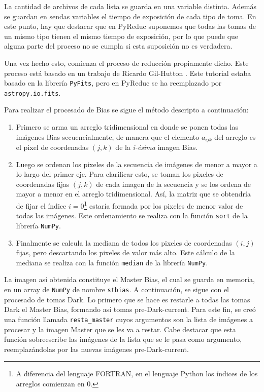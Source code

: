 \documentclass[a4paper, 12pt]{article}
\begin{document}
La cantidad de archivos de cada lista se guarda en una variable distinta. Además se guardan en sendas variables el tiempo de exposición de cada tipo de toma. En este punto, hay que destacar que en PyReduc suponemos que todas las tomas de un mismo tipo tienen el mismo tiempo de exposición, por lo que puede que alguna parte del proceso no se cumpla si esta suposición no es verdadera.

Una vez hecho esto, comienza el proceso de reducción propiamente dicho. Este proceso está basado en un trabajo de Ricardo Gil-Hutton \cite{gil-hutton}. Este tutorial estaba basado en la librería \texttt{PyFits},
pero en PyReduc se ha  reemplazado por {\tt astropy.io.fits}.


 Para realizar el procesado de Bias se sigue el método descripto a continuación:
 \begin{enumerate}
 \item Primero se arma un arreglo tridimensional en donde se ponen todas las imágenes Bias secuencialmente, de manera que el elemento $a_{ijk}$ del arreglo es el pixel de coordenadas $(j,k)$ de la {\it i-ésima} imagen Bias.
 \item Luego se ordenan los pixeles de la secuencia de imágenes de menor a mayor a lo largo del primer eje. Para clarificar esto, se toman los pixeles de coordenadas fijas $(j,k)$ de cada imagen de la secuencia y se los ordena de mayor a menor en el arreglo tridimensional. Así, la matriz que se obtendría de fijar el índice $i=0$\footnote{A diferencia del lenguaje FORTRAN, en el lenguaje Python los índices de los arreglos comienzan en 0.} estaría formada por los pixeles de menor valor de todas las imágenes. Este ordenamiento se realiza con la función \texttt{sort} de la librería \texttt{NumPy}.
 \item Finalmente se calcula la mediana de todos los pixeles de coordenadas $(i,j)$ fijas, pero descartando los pixeles de valor más alto. Este cálculo de la mediana se realiza con la función \texttt{median} de la librería \texttt{NumPy}.
 \end{enumerate}
 

 La imagen así obtenida constituye el Master Bias, el cual se guarda en memoria, en un array de \texttt{NumPy} de nombre \texttt{stbias}. A continuación, se sigue con el procesado de tomas Dark. Lo primero que se hace es restarle a todas las tomas Dark el Master Bias, formando así tomas pre-Dark-current. Para este fin, se creó una función llamada \texttt{resta\_master} cuyos argumentos son la lista de imágenes a procesar y la imagen Master que se les va a restar. Cabe destacar que esta función sobreescribe las imágenes de la lista que se le pasa como argumento, reemplazándolas por las nuevas imágenes pre-Dark-current.
\end{document}
